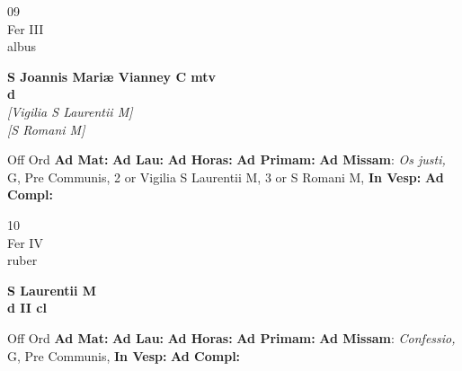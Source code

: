 \documentclass[10pt, openany]{book}
\begin{document}
        \begin{center}
            \begin{minipage}{3.5in}
                \vspace{2em}
                \begin{minipage}{0.5in}
                    {\Huge 09} \\
                    {\normalsize Fer III} \\
                    {\normalsize albus}
                \end{minipage}
                \begin{minipage}{3.0in}
                    \textbf{ \large S Joannis Mariæ Vianney C mtv \\
                    \textnormal{\normalsize d}} \\ \textit{[Vigilia S Laurentii M]} \\ \textit{[S Romani M]} \\ 
                \end{minipage}
                \begin{justify}Off Ord
                    \textbf{Ad Mat: }
                    \textbf{Ad Lau: }
                    \textbf{Ad Horas: }
                    \textbf{Ad Primam: }\textbf{Ad Missam}: \textit{Os justi,} G, Pre Communis, 2 or Vigilia S Laurentii M, 3 or S Romani M,  
                    \textbf{In Vesp: }
                    \textbf{Ad Compl: }
                \end{justify}
            \end{minipage}
        \end{center}
    
        \begin{center}
            \begin{minipage}{3.5in}
                \vspace{2em}
                \begin{minipage}{0.5in}
                    {\Huge 10} \\
                    {\normalsize Fer IV} \\
                    {\normalsize ruber}
                \end{minipage}
                \begin{minipage}{3.0in}
                    \textbf{ \large S Laurentii M \\
                    \textnormal{\normalsize d II cl}} \\ 
                \end{minipage}
                \begin{justify}Off Ord
                    \textbf{Ad Mat: }
                    \textbf{Ad Lau: }
                    \textbf{Ad Horas: }
                    \textbf{Ad Primam: }\textbf{Ad Missam}: \textit{Confessio,} G, Pre Communis,  
                    \textbf{In Vesp: }
                    \textbf{Ad Compl: }
                \end{justify}
            \end{minipage}
        \end{center}
    
\end{document}
